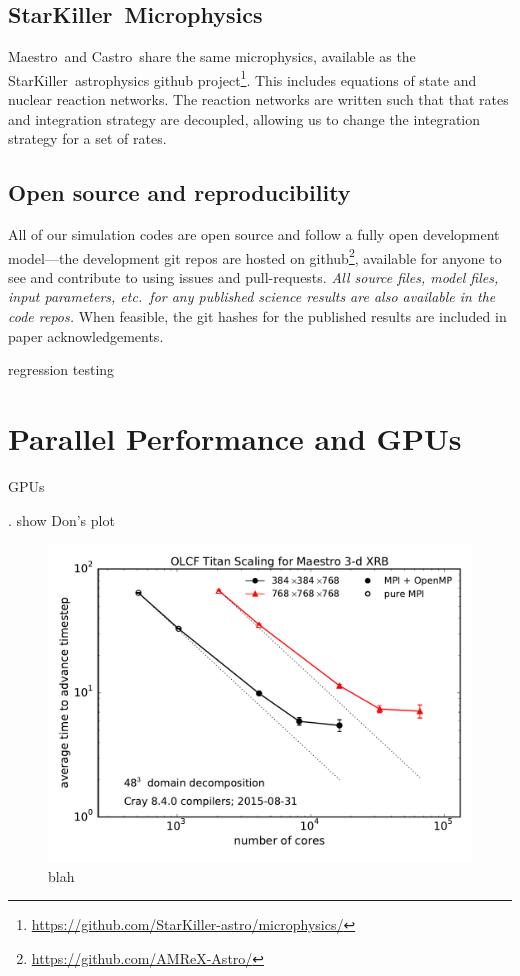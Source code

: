 \documentclass[letterpaper]{jpconf}
\newcommand{\maestro}{{\sffamily Maestro}}
\newcommand{\castro}{{\sffamily Castro}}
\newcommand{\starkiller}{{\sffamily StarKiller}}
\begin{document}
\subsection{\starkiller\ Microphysics}

\maestro\ and \castro\ share the same microphysics, available as the
\starkiller\ astrophysics github
project\footnote{\url{https://github.com/StarKiller-astro/microphysics/}}.
This includes equations of state and nuclear reaction networks.  The
reaction networks are written such that that rates and integration
strategy are decoupled, allowing us to change the integration strategy
for a set of rates.  


\subsection{Open source and reproducibility}

All of our simulation codes are open source and follow a fully open
development model---the development git repos are hosted on
github\footnote{\url{https://github.com/AMReX-Astro/}}, available for
anyone to see and contribute to using issues and pull-requests.
{\em All source files, model files, input parameters, etc.\ for any
published science results are also available in the code repos.}  When
feasible, the git hashes for the published results are included in paper
acknowledgements.

regression testing


\section{Parallel Performance and GPUs}


GPUs

     . show Don's plot

\begin{figure}[t]
\centering
\includegraphics[width=0.5\linewidth]{titan_xrb_scaling}
\caption{\label{fig:maestro_scaling} blah}
\end{figure}
\end{document}
